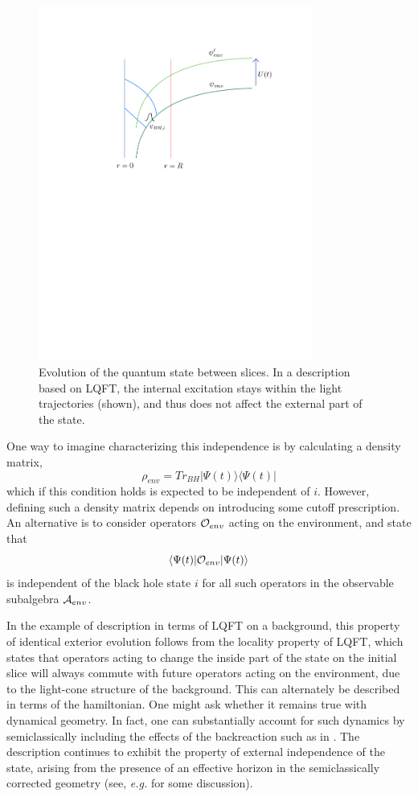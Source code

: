 \documentclass[12pt]{article}
\numberwithin{equation}{section}
\newcommand{\calo}{{\cal O}}
\newcommand{\cala}{{\cal A}}
\newcommand{\beq}{\begin{equation}}
\newcommand{\eeq}{\end{equation}}
\begin{document}
\begin{figure}[!hbtp] \begin{center}
\includegraphics[width=9cm]{Fig-slices.pdf}
\end{center}
\caption{Evolution of the quantum state between slices.  In a description based on LQFT, the internal excitation stays within the light trajectories (shown), and thus does not affect the external part of the state.}
\label{Figslices}
\end{figure} 


One way to imagine characterizing this independence is by calculating a density matrix,
\beq
\rho_{env} = Tr_{BH}|\Psi(t)\rangle\langle\Psi(t)|
\eeq
which if this condition holds is expected to be independent of $i$.  However, defining such a density matrix depends on introducing some cutoff prescription.  An alternative is to consider operators $\calo_{env}$ acting on the environment, and state that
\beq
\langle\Psi(t)|{\cal O}_{env}|\Psi(t)\rangle
\eeq
is independent of the black hole state $i$ for all such operators in the observable subalgebra $\cala_{env}$.  

In the example of description in terms of  LQFT on a background, this property of identical exterior evolution follows from the locality property of LQFT, which states that operators acting to change the inside part of the state on the initial slice will always commute with  future operators acting on the environment, due to the light-cone structure of the background.  This can alternately be described in terms of the hamiltonian.  One might ask whether it remains true with dynamical geometry.  In fact, one can substantially account for such dynamics by semiclassically including the effects of the backreaction such as in \cite{CGHS}.  The description continues to exhibit the property of external independence of the state, arising from the presence of an effective horizon in the semiclassically corrected geometry (see, {\it e.g.} \cite{GiNe} for some discussion).
\end{document}
